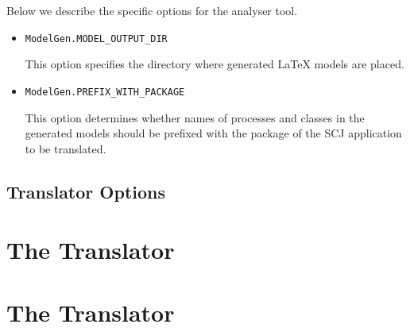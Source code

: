 \documentclass{report}
\begin{document}
Below we describe the specific options for the analyser tool.
%
%
\begin{itemize}
  \item \verb"ModelGen.MODEL_OUTPUT_DIR"

  This option specifies the directory where generated {\LaTeX} {\Circus} models are placed.

  \item \verb"ModelGen.PREFIX_WITH_PACKAGE"

  This option determines whether names of {\Circus} processes and classes in the generated models should be prefixed with the package of the SCJ application to be translated.
\end{itemize}

\section{{\mSafe} Translator Options}


\chapter{The {\Circus} Translator}
\label{chap:CircusTranslator}



\chapter{The {\mSafe} Translator}
\label{chap:mSafeTranslator}






\end{document}
